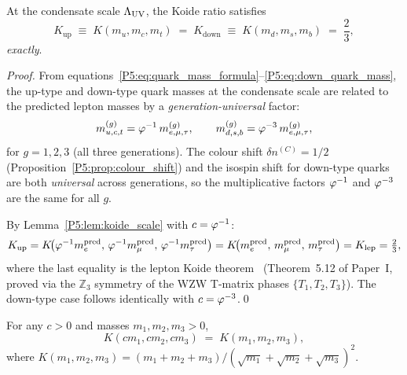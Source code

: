 

\begin{theorem}
\label{P5:thm:quark_koide}
At the condensate scale $\Lambda_{\mathrm{UV}}$, the Koide ratio satisfies
\begin{equation}
  K_{\mathrm{up}} \;\equiv\; K(m_u,m_c,m_t)
  \;=\; K_{\mathrm{down}} \;\equiv\; K(m_d,m_s,m_b)
  \;=\; \frac{2}{3},
  \label{P5:eq:quark_koide}
\end{equation}
\emph{exactly}.
\end{theorem}
\begin{proof}
From equations~\eqref{P5:eq:quark_mass_formula}--\eqref{P5:eq:down_quark_mass},
the up-type and down-type quark masses at the condensate scale are
related to the predicted lepton masses by a \emph{generation-universal} factor:
\begin{equation}
  m_{u,c,t}^{(g)} = \varphi^{-1}\,m_{e,\mu,\tau}^{(g)}, \qquad
  m_{d,s,b}^{(g)} = \varphi^{-3}\,m_{e,\mu,\tau}^{(g)},
  \label{P5:eq:quark_lepton_factor}
\end{equation}
for $g=1,2,3$ (all three generations).  The colour shift $\delta n^{(C)}=1/2$
(Proposition~\ref{P5:prop:colour_shift}) and the isospin shift for down-type quarks
are both \emph{universal} across generations, so the multiplicative factors
$\varphi^{-1}$ and $\varphi^{-3}$ are the same for all $g$.

By Lemma~\ref{P5:lem:koide_scale} with $c=\varphi^{-1}$:
\[
  K_{\mathrm{up}}
  = K\!\bigl(\varphi^{-1}m_e^{\mathrm{pred}},\,\varphi^{-1}m_\mu^{\mathrm{pred}},\,
    \varphi^{-1}m_\tau^{\mathrm{pred}}\bigr)
  = K\!\bigl(m_e^{\mathrm{pred}},\,m_\mu^{\mathrm{pred}},\,m_\tau^{\mathrm{pred}}\bigr)
  = K_{\mathrm{lep}} = \tfrac{2}{3},
\]
where the last equality is the lepton Koide theorem~\cite{Paper1}
(Theorem~5.12 of Paper~I, proved via the $\mathbb{Z}_3$ symmetry of
the WZW T-matrix phases $\{T_1,T_2,T_3\}$).
The down-type case follows identically with $c=\varphi^{-3}$.\qed
\end{proof}

\begin{lemma}
\label{P5:lem:koide_scale}
For any $c>0$ and masses $m_1,m_2,m_3>0$,
\begin{equation}
  K(cm_1,cm_2,cm_3) \;=\; K(m_1,m_2,m_3),
  \label{P5:eq:koide_scale}
\end{equation}
where $K(m_1,m_2,m_3) = (m_1+m_2+m_3)/(\sqrt{m_1}+\sqrt{m_2}+\sqrt{m_3})^2$.
\end{lemma}

